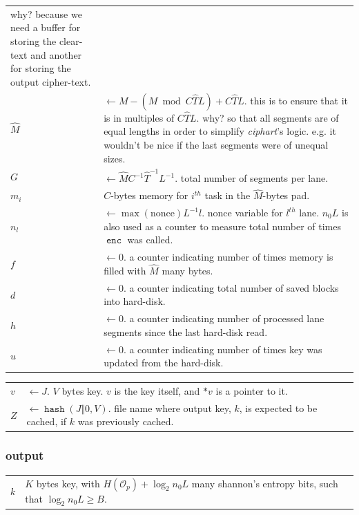\documentclass[twocolumn]{article}
\DeclareMathOperator{\enc}{\mathtt{enc}}
\DeclareMathOperator{\maxf}{max}
\DeclareMathOperator{\hash}{\mathtt{hash}}
\begin{document}
\begin{tabularx}{\columnwidth}{lX}
                    why?  because we need a buffer for storing the
                    clear-text and another for storing the output
                    cipher-text.\\
    $\hat M$    & $\gets M - (M \bmod C\hat TL) + C\hat TL$.  this is to
                    ensure that it is in multiples of $C\hat TL$.  why?  so
                    that all segments are of equal lengths in order to
                    simplify \emph{ciphart}'s logic.  e.g. it wouldn't be
                    nice if the last segments were of unequal sizes.\\
    $G$         & $\gets \hat MC^{-1}\hat T^{-1}L^{-1}$.  total number of
                    segments per lane.\\
    $m_i$       & $C$-bytes memory for $i^{th}$ task in the $\hat M$-bytes
                    pad.\\
    $n_l$       & $\gets \maxf(\text{nonce})L^{-1}l$.  nonce variable for
                    $l^{th}$ lane.  $n_0L$ is also used as a counter to
                    measure total number of times $\enc$ was called.\\
    $f$         & $\gets 0$.  a counter indicating number of times
                    memory is filled with $\hat M$ many bytes.\\
    $d$         & $\gets 0$.  a counter indicating total number of saved
                    blocks into hard-disk.\\
    $h$         & $\gets 0$.  a counter indicating number of processed lane
                    segments since the last hard-disk read.\\
    $u$         & $\gets 0$.  a counter indicating number of times key was
                    updated from the hard-disk.\\
\end{tabularx}
\begin{tabularx}{\columnwidth}{lX}
    $v$         & $\gets J$.  $V$ bytes key.  $v$ is the key
                    itself, and $*v$ is a pointer to it.\\
    $Z$         & $\gets \hash(J \Vert 0, V)$.  file name where output key,
                    $k$, is expected to be cached, if $k$ was previously
                    cached.\\
\end{tabularx}

\subsubsection{output}
\begin{tabularx}{\columnwidth}{lX}
$k$ & $K$ bytes key, with $H(\mathcal{O}_p) + \log_2 n_0L$ many shannon's
        entropy bits, such that $\log_2 n_0L \ge B$.\\
\end{tabularx}
\end{document}
